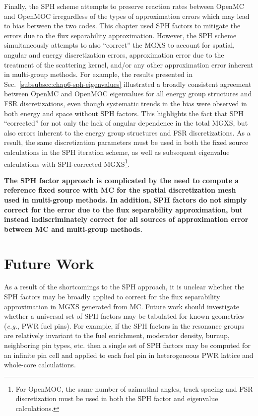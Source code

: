 Finally, the \ac{SPH} scheme attempts to preserve reaction rates between OpenMC and OpenMOC irregardless of the types of approximation errors which may lead to bias between the two codes. This chapter used \ac{SPH} factors to mitigate the errors due to the flux separability approximation. However, the \ac{SPH} scheme simultaneously attempts to also ``correct'' the \ac{MGXS} to account for spatial, angular and energy discretization errors, approximation error due to the treatment of the scattering kernel, and/or any other approximation error inherent in multi-group methods. For example, the results presented in Sec.~\ref{subsubsec:chap6-sph-eigenvalues} illustrated a broadly consistent agreement between OpenMC and OpenMOC eigenvalues for all energy group structures and \ac{FSR} discretizations, even though systematic trends in the bias were observed in both energy and space without \ac{SPH} factors. This highlights the fact that \ac{SPH} ``corrected'' for not only the lack of angular dependence in the total \ac{MGXS}, but also errors inherent to the energy group structures and \ac{FSR} discretizations. As a result, the same discretization parameters must be used in both the fixed source calculations in the \ac{SPH} iteration scheme, as well as subsequent eigenvalue calculations with \ac{SPH}-corrected \ac{MGXS}\footnote{For OpenMOC, the same number of azimuthal angles, track spacing and \ac{FSR} discretization must be used in both the \ac{SPH} factor and eigenvalue calculations.}.

\clearpage

\begin{emphbox}
\textbf{The \ac{SPH} factor approach is complicated by the need to compute a reference fixed source with \ac{MC} for the spatial discretization mesh used in multi-group methods. In addition, \ac{SPH} factors do not simply correct for the error due to the flux separability approximation, but instead indiscriminately correct for all sources of approximation error between \ac{MC} and multi-group methods.}
\end{emphbox}

\section{Future Work}
\label{sec:chap6-sph-future}

As a result of the shortcomings to the \ac{SPH} approach, it is unclear whether the \ac{SPH} factors may be broadly applied to correct for the flux separability approximation in \ac{MGXS} generated from \ac{MC}. Future work should investigate whether a universal set of \ac{SPH} factors may be tabulated for known geometries (\textit{e.g.}, \ac{PWR} fuel pins). For example, if the \ac{SPH} factors in the resonance groups are relatively invariant to the fuel enrichment, moderator density, burnup, neighboring pin types, etc. then a single set of \ac{SPH} factors may be computed for an infinite pin cell and applied to each fuel pin in heterogeneous \ac{PWR} lattice and whole-core calculations. 

